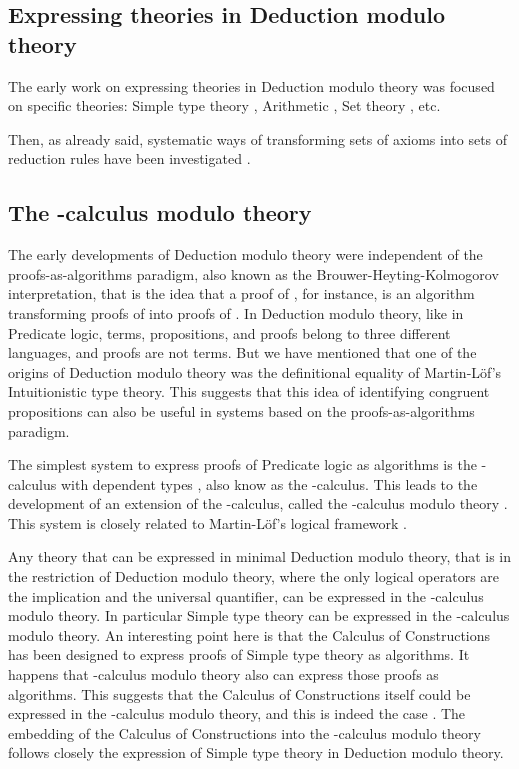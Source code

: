 \documentclass{llncs}
\begin{document}
\subsection{Expressing theories in Deduction modulo theory}

The early work on expressing theories in Deduction modulo theory 
was focused on specific theories: Simple type theory \cite{DHKHOL}, 
Arithmetic \cite{Peano,Allali}, Set theory \cite{DowekMiquel}, etc.

Then, as already said, systematic ways of transforming sets of axioms
into sets of reduction rules have been investigated
\cite{stacs,Burel,Burel9}.

\subsection{The -calculus modulo theory}

The early developments of Deduction modulo theory were 
independent of the proofs-as-algorithms paradigm, also 
known as the Brouwer-Heyting-Kolmogorov interpretation, that is the idea 
that a proof of , for instance, is an algorithm transforming 
proofs of  into proofs of .
In Deduction modulo
theory, like in Predicate logic, 
terms, propositions, and proofs belong to three different
languages, and proofs are not terms. But we have mentioned that one
of the origins of Deduction modulo theory was the definitional equality of
Martin-L\"of's Intuitionistic type theory. This suggests that this
idea of identifying congruent propositions can also be useful in
systems based on the proofs-as-algorithms paradigm.

The simplest system to express proofs of Predicate logic as algorithms is the
-calculus with dependent types \cite{HHP}, also know as the -calculus. This leads to the development of an extension of the
-calculus, called the -calculus modulo
theory \cite{CousineauDowek}. This system is closely related to 
Martin-L\"of's logical framework \cite{NPS}. 

Any theory that can be expressed in minimal Deduction modulo theory,
that is in the restriction of Deduction modulo theory, where the only
logical operators are the implication and the universal quantifier,
can be expressed in the -calculus modulo theory. In
particular Simple type theory can be expressed in the -calculus modulo theory. An interesting point here is that the
Calculus of Constructions \cite{CoquandHuet} has been designed to
express proofs of Simple type theory as algorithms.  It happens that
-calculus modulo theory also can express those proofs as
algorithms. This suggests that the Calculus of Constructions itself
could be expressed in the -calculus modulo theory, and
this is indeed the case \cite{CousineauDowek}. The embedding of the
Calculus of Constructions into the -calculus modulo
theory follows closely the expression of Simple type theory in
Deduction modulo theory.
\end{document}
